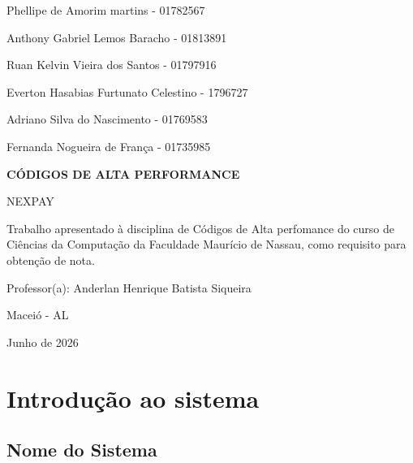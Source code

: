 \documentclass{article}
\begin{document}
\begin{titlepage}

\begin{center}

Phellipe de Amorim martins - 01782567

Anthony Gabriel Lemos Baracho - 01813891

Ruan Kelvin Vieira dos Santos - 01797916

Everton Hasabias Furtunato Celestino - 1796727

Adriano Silva do Nascimento - 01769583

Fernanda Nogueira de França - 01735985

\vspace{6cm}

{\fontsize{16pt}{20pt}\selectfont\textbf{CÓDIGOS DE ALTA PERFORMANCE}}

\vspace{0.5cm}

NEXPAY

\end{center}

\vspace{3cm}

\hspace*{7cm}
\parbox{8cm}{
Trabalho apresentado à disciplina de
Códigos de Alta perfomance do curso de
Ciências da Computação da Faculdade Maurício de Nassau,
como requisito para obtenção de nota.

\vspace{0.5cm}

Professor(a): Anderlan Henrique Batista Siqueira
}

\vfill

\begin{center}

Maceió - AL

Junho de 2026

\end{center}

\end{titlepage}


\tableofcontents
\newpag

\clearpage
\section{Introdução ao sistema}

\subsection{Nome do Sistema}
\end{document}
